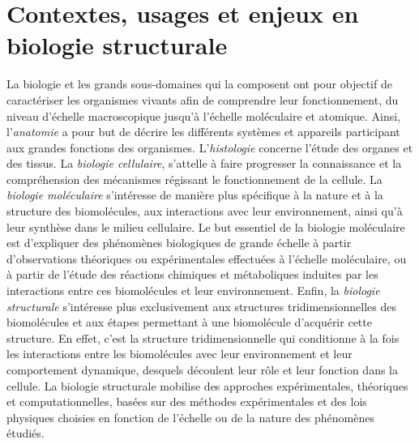 
\chapter[Contextes, usages et enjeux en biologie structurale]{Contextes, usages et enjeux en biologie structurale}
\minitoc
\cleardoublepage






La biologie et les grands sous-domaines qui la composent ont pour objectif de caractériser les organismes vivants afin de comprendre leur fonctionnement, du niveau d'échelle macroscopique jusqu'à l'échelle moléculaire et atomique. Ainsi, l'\emph{anatomie} a pour but de décrire les différents systèmes et appareils participant aux grandes fonctions des organismes. L'\emph{histologie} concerne l'étude des organes et des tissus. La \emph{biologie  cellulaire}, s'attelle à faire progresser la connaissance et la compréhension des mécanismes régissant le fonctionnement de la cellule. La \emph{biologie moléculaire} s'intéresse de manière plus spécifique à la nature et à la structure des biomolécules, aux interactions avec leur environnement, ainsi qu'à leur synthèse dans le milieu cellulaire. Le but essentiel de la biologie moléculaire est d'expliquer des phénomènes biologiques de grande échelle à partir d'observations théoriques ou expérimentales effectuées à l'échelle moléculaire, ou à partir de l'étude des réactions chimiques et métaboliques induites par les interactions entre ces biomolécules et leur environnement. Enfin, la \emph{biologie structurale} s'intéresse plus exclusivement aux structures tridimensionnelles des biomolécules et aux étapes permettant à une biomolécule d'acquérir cette structure. En effet, c'est la structure tridimensionnelle qui conditionne à la fois les interactions entre les biomolécules avec leur environnement et leur comportement dynamique, desquels découlent leur rôle et leur fonction dans la cellule. La biologie structurale mobilise des approches expérimentales, théoriques et computationnelles, basées sur des méthodes expérimentales et des lois physiques choisies en fonction de l'échelle ou de la nature des phénomènes étudiés.

